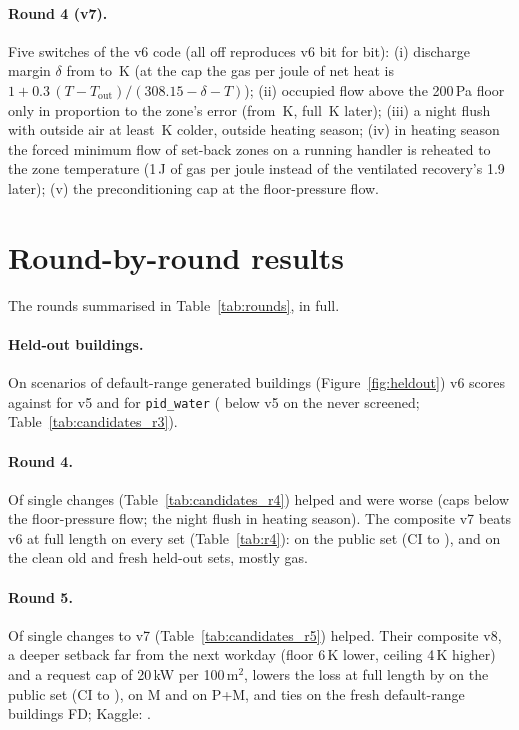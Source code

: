 \documentclass{article}
\begin{document}
\paragraph{Round 4 (v7).}
\label{sec:v7}
Five switches of the v6 code (all off reproduces v6 bit for bit): (i) discharge margin $\delta$ from
\VSixDischMargin{} to \ParRFDischMargin\,K (at the cap the gas per joule of net heat is
$1 + 0.3\,(T - T_{\text{out}})/(308.15 - \delta - T)$); (ii) occupied flow above the 200\,Pa floor only in
proportion to the zone's error (from \ParRFOccEzero\,K, full \ParRFOccSpan\,K later); (iii) a night flush with
outside air at least \ParRFFlushDt\,K colder, outside heating season; (iv) in heating season the forced minimum
flow of set-back zones on a running handler is reheated to the zone temperature (1\,J of gas per joule instead
of the ventilated recovery's 1.9 later); (v) the preconditioning cap at the floor-pressure flow.

\section{Round-by-round results}
\label{app:rounds}
The rounds summarised in Table~\ref{tab:rounds}, in full.

\paragraph{Held-out buildings.}
On \NHeldAll{} scenarios of \NHeldAllBuild{} default-range generated buildings (Figure~\ref{fig:heldout}) v6 scores
\HeldAllMetricOurs{} against \HeldAllMetricOursVFive{} for v5 and \HeldAllMetricPidWater{} for \texttt{pid\_water}
(\HeldUnscrVFiveRelRed{} below v5 on the \NHeldUnscr{} never screened; Table~\ref{tab:candidates_r3}).

\paragraph{Round 4.}
Of \RFNSingles{} single changes (Table~\ref{tab:candidates_r4}) \RFNHelps{} helped and \RFNWorse{} were worse (caps
below the floor-pressure flow; the night flush in heating season). The composite v7 beats v6 at full length on every
set (Table~\ref{tab:r4}): \RFConfPubRed{} on the public set (CI \RFConfPubRedLo{} to \RFConfPubRedHi),
\RFConfOldCleanRed{} and \RFConfFreshRed{} on the clean old and fresh held-out sets, mostly gas.

\paragraph{Round 5.}
Of \RFiveNSingles{} single changes to v7 (Table~\ref{tab:candidates_r5}) \RFiveNHelps{} helped. Their composite v8, a
deeper setback far from the next workday (floor 6\,K lower, ceiling 4\,K higher) and a request cap of 20\,kW per
100\,m$^2$, lowers the loss at full length by
\RFiveConfPubRelAbs{} on the public set (CI \RFiveConfPubRelHiAbs{} to \RFiveConfPubRelLoAbs), \RFiveConfMinnRelAbs{} on
M and \RFiveConfPubMinnRelAbs{} on P+M, and ties on the fresh default-range buildings FD; Kaggle: \RFiveKagVEight.
\end{document}
